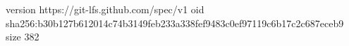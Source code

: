 version https://git-lfs.github.com/spec/v1
oid sha256:b30b127b612014c74b3149feb233a338fef9483c0ef97119c6b17c2c687eceb9
size 382
